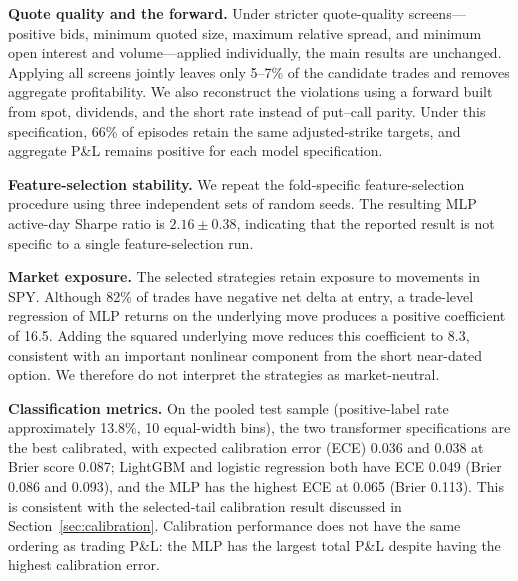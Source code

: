 \documentclass[sigconf,review,anonymous]{acmart}
\begin{document}
\noindent\textbf{Quote quality and the forward.}
Under stricter quote-quality screens---positive bids, minimum quoted size, maximum relative spread, and minimum open interest and volume---applied individually, the main results are unchanged. Applying all screens jointly leaves only 5--7\% of the candidate trades and removes aggregate profitability.
We also reconstruct the violations using a forward built from spot, dividends, and the short rate instead of put--call parity. Under this specification, 66\% of episodes retain the same adjusted-strike targets, and aggregate P\&L remains positive for each model specification.

\noindent\textbf{Feature-selection stability.}
We repeat the fold-specific feature-selection procedure using three independent sets of random seeds. The resulting MLP active-day Sharpe ratio is $2.16\pm0.38$, indicating that the reported result is not specific to a single feature-selection run.

\noindent\textbf{Market exposure.}
The selected strategies retain exposure to movements in SPY. Although 82\% of trades have negative net delta at entry, a trade-level regression of MLP returns on the underlying move produces a positive coefficient of 16.5. Adding the squared underlying move reduces this coefficient to 8.3, consistent with an important nonlinear component from the short near-dated option. We therefore do not interpret the strategies as market-neutral.

\noindent\textbf{Classification metrics.}
On the pooled test sample (positive-label rate approximately 13.8\%, 10 equal-width bins), the two transformer specifications are the best calibrated, with expected calibration error (ECE) 0.036 and 0.038 at Brier score 0.087; LightGBM and logistic regression both have ECE 0.049 (Brier 0.086 and 0.093), and the MLP has the highest ECE at 0.065 (Brier 0.113). This is consistent with the selected-tail calibration result discussed in Section~\ref{sec:calibration}. Calibration performance does not have the same ordering as trading P\&L: the MLP has the largest total P\&L despite having the highest calibration error.
\end{document}
